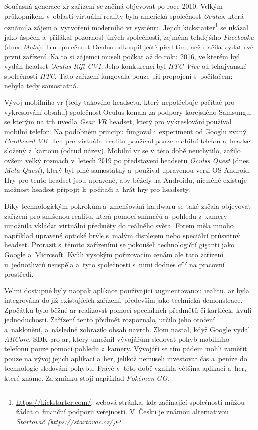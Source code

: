 Současná generace \gls{xr} zařízení se začíná objevovat po roce 2010. Velkým průkopníkem v~oblasti virtuální reality byla americká společnost \textit{Oculus}, která oznámila zájem o~vytvoření moderního \gls{vr} systému. Jejich kickstarter\footnote{\url{https://kickstarter.com/}; webová stránka, kde začínající společnosti můžou žádat o~finanční podporu veřejnosti. V~Česku je známou alternativou \em Startovač (\url{https://startovac.cz/})} se ukázal jako úspěch a~přilákal pozornost jiných společností, zejména tehdejšího \textit{Facebooku} (dnes \textit{Meta}). Ten společnost Oculus odkoupil ještě před tím, než stačila vydat své první zařízení. Na to si zájemci museli počkat až do roku 2016, ve kterém byl vydán headset \textit{Oculus Rift CV1}. Jeho konkurencí byl \textit{HTC Vive} od tchajvanské společnosti \textit{HTC}. Tato zařízení fungovala pouze při propojení s~počítačem; nebyla tedy samostatná. \cite{otechnice_3}

Vývoj mobilního \gls{vr} (tedy takového headsetu, který nepotřebuje počítač pro vykreslování obsahu) společnost Oculus konala za podpory korejského Samsungu, se kterým na trh uvedla \textit{Gear VR} \poml headset, který pro vykreslování používal mobilní telefon. Na podobném principu fungoval i~experiment od Googlu zvaný \textit{Cardboard VR}. Ten pro virtuální realitu používal pouze mobilní telefon a~headset složený z~kartonu (odtud název). Mobilní \gls{vr} se v~této době neuchytilo, zažilo ovšem velký rozmach v~letech 2019 po představení headsetu \textit{Oculus Quest} (dnes \textit{Meta Quest}), který byl plně samostatný a~používal upravenou verzi OS Android. Hry pro tento headset jsou upravené, aby běžely na Androidu, nicméně existuje možnost headset připojit k~počítači a~hrát hry pro  headsety. \cite{otechnice_3}

Díky technologickým pokrokům a~zmenšování hardwaru se také začala objevovat zařízení pro smíšenou realitu, která pomocí snímačů a~pohledu z~kamery umožnila vkládat virtuální předměty do reálného světa. Forem měla mno\-ho \poml například upravené optické brýle s~malým displejem nebo speciální průsvitný headset. Prorazit s~těmito zařízeními se pokoušeli technologičtí giganti jako Google a~Microsoft. Kvůli vysokým pořizovacím cenám ale tato zařízení u~jednotlivců neuspěla a~tyto společnosti s~nimi dodnes cílí na pracovní prostředí. \cite{google_glass_mobilenet}

Velmi dostupné byly naopak aplikace používající augmentovanou realitu. \gls{ar} byla integrována do již existujících zařízení, především jako technická demonstrace. Zpočátku bylo běžné \gls{ar} realizovat pomocí speciálních předmětů či kartiček, kvůli jednoduchosti. Zařízení tento předmět rozpoznalo, určilo jeho otočení a~naklonění, a~následně zobrazilo obsah navrch. Zlom nastal, když Google vydal \textit{ARCore}, \gls{SDK} pro \gls{ar}, který umožnil vývojářům sledovat pohyb mobilního telefonu pouze pomocí pohledu z~kamery. Vývojáři se tím pádem mohli zaměřit pouze na vývoj jejich aplikací a~her, jelikož nemuseli investovat čas a~peníze do technologie sledování pohybu. Právě v~této době vznikla většina aplikací a~her, které známe. Za zmínku stojí například \textit{Pokémon GO}. \cite{enwiki:1182789097}

